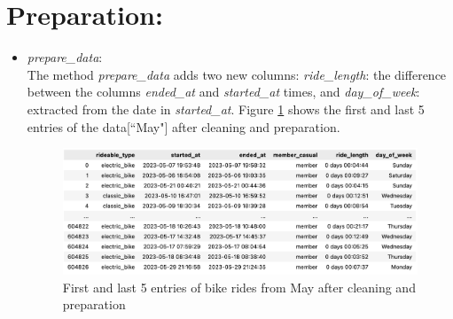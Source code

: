 \documentclass[12pt]{article}
\begin{document}
\section*{Preparation:}
\begin{itemize}
\item \textit{prepare\_data}:\\
	The method \textit{prepare\_data} adds two new columns: \textit{ride\_length}: the difference between the columns \textit{ended\_at} and \textit{started\_at} times, and \textit{day\_of\_week}: extracted from the date in \textit{started\_at}. Figure \ref{fig7} shows the first and last 5 entries of the data[``May"] after cleaning and preparation.

	\begin{figure}[h]
	\hspace{1cm}
	\includegraphics[width=5.8 in, height = 1.9 in]{imgMay2.png}
	\caption{First and last 5 entries of bike rides from May after cleaning and preparation}
	\label{fig7}
	\end{figure}
\end{itemize}
	
\end{document}
